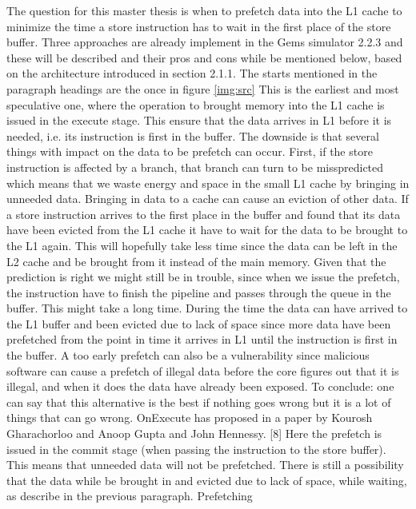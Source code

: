 The question for this master thesis is when to prefetch data into the L1 cache to
minimize the time a store instruction has to wait in the first place of the store buffer.
Three approaches are already implement in the Gems simulator 2.2.3 \fixme and these will
be described and their pros and cons while be mentioned below, based on the architecture
introduced in section 2.1.1. \fixme The starts mentioned in the paragraph headings
are the once in figure \ref{img:src}
 This is the earliest and most speculative one, where the
operation to brought memory into the L1 cache is issued in the execute stage. This
ensure that the data arrives in L1 before it is needed, i.e. its instruction is first in the
buffer. The downside is that several things with impact on the data to be prefetch can
occur. First, if the store instruction is affected by a branch, that branch can turn to
be misspredicted which means that we waste energy and space in the small L1 cache
by bringing in unneeded data. Bringing in data to a cache can cause an eviction of
other data. If a store instruction arrives to the first place in the buffer and found that
its data have been evicted from the L1 cache it have to wait for the data to be brought
to the L1 again. This will hopefully take less time since the data can be left in the L2
cache and be brought from it instead of the main memory. Given that the prediction
is right we might still be in trouble, since when we issue the prefetch, the instruction
have to finish the pipeline and passes through the queue in the buffer. This might
take a long time. During the time the data can have arrived to the L1 buffer and been
evicted due to lack of space since more data have been prefetched from the point in
time it arrives in L1 until the instruction is first in the buffer. A too early prefetch
can also be a vulnerability since malicious software can cause a prefetch of illegal data
before the core figures out that it is illegal, and when it does the data have already
been exposed. To conclude: one can say that this alternative is the best if nothing
goes wrong but it is a lot of things that can go wrong. OnExecute has proposed in a
paper by Kourosh Gharachorloo and Anoop Gupta and John Hennessy. [8]\fixme
{} Here the prefetch is issued in the commit stage (when passing
the instruction to the store buffer). This means that unneeded data will not be
prefetched. There is still a possibility that the data while be brought in and evicted
due to lack of space, while waiting, as describe in the previous paragraph. Prefetching
